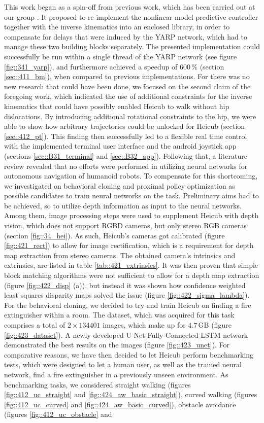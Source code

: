\label{sec::5_co}
This work began as a spin-off from previous work, which has been carried out at our group \cite{stein2017closed}. It proposed to re-implement the nonlinear model predictive controller together with the inverse kinematics into an enclosed library, in order to compensate for delays that were induced by the YARP network, which had to manage these two building blocks separately. The presented implementation could successfully be run within a single thread of the YARP network (see figure \ref{fig::341_yarp}), and furthermore achieved a speedup of $600\,\%$ (section \ref{sec::411_bm}), when compared to previous implementations. For there was no new research that could have been done, we focused on the second claim of the foregoing work, which indicated the use of additional constraints for the inverse kinematics that could have possibly enabled Heicub to walk without hip dislocations. By introducing additional rotational constraints to the hip, we were able to show how arbitrary trajectories could be unlocked for Heicub (section \ref{sec::412_pt}). This finding then successfully led to a flexible real time control with the implemented terminal user interface and the android joystick app (sections \ref{sec::B31_terminal} and \ref{sec::B32_app}). Following that, a literature review revealed that no efforts were performed in utilizing neural networks for autonomous navigation of humanoid robots. To compensate for this shortcoming, we investigated on behavioral cloning and proximal policy optimization as possible candidates to train neural networks on the task. Preliminary aims had to be achieved, so to utilize depth information as input to the neural networks. Among them, image processing steps were used to supplement Heicub with depth vision, which does not support RGBD cameras, but only stereo RGB cameras (section \ref{fig::34_hei}). As such, Heicub's cameras got calibrated (figure \ref{fig::421_rect}) to allow for image rectification, which is a requirement for depth map extraction from stereo cameras. The obtained camera's intrinsics and extrinsics, are listed in table \ref{tab::421_extrinsics}. It was then proven that simple block matching algorithms were not sufficient to allow for a depth map extraction (figure \ref{fig::422_disp} (a)), but instead it was shown how confidence weighted least squares disparity maps solved the issue (figure \ref{fig::422_sigma_lambda}). For the behavioral cloning, we decided to try and train Heicub on finding a fire extinguisher within a room. The dataset, which was acquired for this task comprises a total of $2\times134401$ images, which make up for $4.7\,\text{GB}$ (figure \ref{fig::423_dataset}). A newly developed U-Net-Fully-Connected-LSTM network demonstrated the best results on the images (figure \ref{fig::423_unet}). For comparative reasons, we have then decided to let Heicub perform benchmarking tests, which were designed to let a human user, as well as the trained neural network, find a fire extinguisher in a previously unseen environment. As benchmarking tasks, we considered straight walking (figures \ref{fig::412_uc_straight} and \ref{fig::424_aw_basic_straight}), curved walking (figures \ref{fig::412_uc_curved} and \ref{fig::424_aw_basic_curved}), obstacle avoidance (figures \ref{fig::412_uc_obstacle} and 